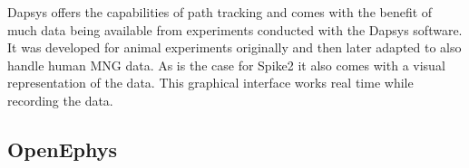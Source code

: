 Dapsys offers the capabilities of path tracking and comes with the benefit of much data being available from experiments conducted with the Dapsys software. It was developed for animal experiments originally and then later adapted to also handle human MNG data. As is the case for Spike2 it also comes with a visual representation of the data. This graphical interface works real time while recording the data.

\subsection{OpenEphys}

